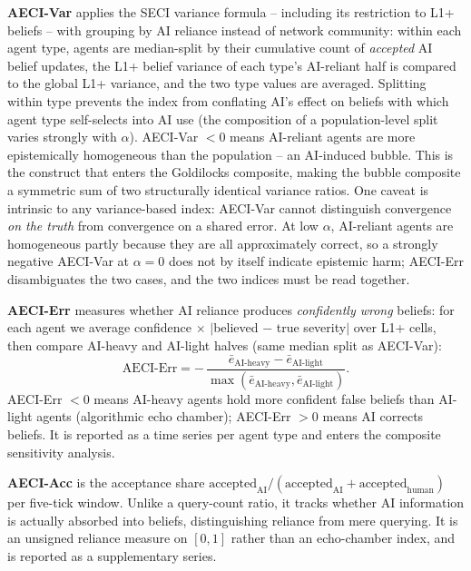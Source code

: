 \documentclass[pdflatex,sn-basic]{sn-jnl}
\begin{document}
\textbf{AECI-Var} applies the SECI variance formula -- including its restriction to L1+ beliefs -- with grouping by AI reliance instead of network community: within each agent type, agents are median-split by their cumulative count of \emph{accepted} AI belief updates, the L1+ belief variance of each type's AI-reliant half is compared to the global L1+ variance, and the two type values are averaged. Splitting within type prevents the index from conflating AI's effect on beliefs with which agent type self-selects into AI use (the composition of a population-level split varies strongly with $\alpha$). AECI-Var $< 0$ means AI-reliant agents are more epistemically homogeneous than the population -- an AI-induced bubble. This is the construct that enters the Goldilocks composite, making the bubble composite a symmetric sum of two structurally identical variance ratios. One caveat is intrinsic to any variance-based index: AECI-Var cannot distinguish convergence \emph{on the truth} from convergence on a shared error. At low $\alpha$, AI-reliant agents are homogeneous partly because they are all approximately correct, so a strongly negative AECI-Var at $\alpha = 0$ does not by itself indicate epistemic harm; AECI-Err disambiguates the two cases, and the two indices must be read together.

\textbf{AECI-Err} measures whether AI reliance produces \emph{confidently wrong} beliefs: for each agent we average confidence $\times$ $|$believed $-$ true severity$|$ over L1+ cells, then compare AI-heavy and AI-light halves (same median split as AECI-Var):
\begin{equation}
\text{AECI-Err} = -\,\frac{\bar{e}_{\text{AI-heavy}} - \bar{e}_{\text{AI-light}}}{\max(\bar{e}_{\text{AI-heavy}}, \bar{e}_{\text{AI-light}})}.
\label{eq:aecierr}
\end{equation}
AECI-Err $< 0$ means AI-heavy agents hold more confident false beliefs than AI-light agents (algorithmic echo chamber); AECI-Err $> 0$ means AI corrects beliefs. It is reported as a time series per agent type and enters the composite sensitivity analysis.

\textbf{AECI-Acc} is the acceptance share $\text{accepted}_{\text{AI}} / (\text{accepted}_{\text{AI}} + \text{accepted}_{\text{human}})$ per five-tick window. Unlike a query-count ratio, it tracks whether AI information is actually absorbed into beliefs, distinguishing reliance from mere querying. It is an unsigned reliance measure on $[0, 1]$ rather than an echo-chamber index, and is reported as a supplementary series.
\end{document}
